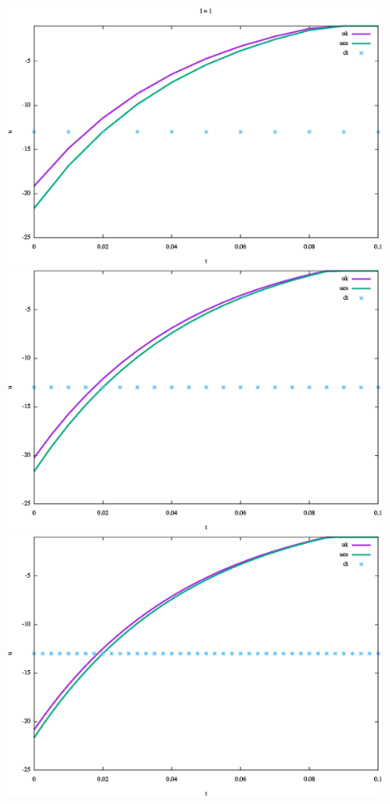 \begin{figure}
\centering
\begin{minipage}{.33\textwidth}
  \centering
  \includegraphics[width=\linewidth]{img/cap5/TestCase01_ues_l1.eps}
\end{minipage}%
\begin{minipage}{.33\textwidth}
  \centering
  \includegraphics[width=\linewidth]{img/cap5/TestCase01_ues_l2.eps}
\end{minipage}
\begin{minipage}{.33\textwidth}
  \centering
  \includegraphics[width=\linewidth]{img/cap5/TestCase01_ues_l3.eps}

\end{minipage}
\end{figure}
